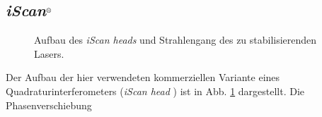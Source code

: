 \subsection{\textit{iScan}$^\text{\textregistered}$}\label{subsec:iScan}
\begin{figure}[h]
 	\centering
	\caption[\textit{iScan head} - Aufbau]{Aufbau
	des \textit{iScan heads} und Strahlengang des zu
	stabilisierenden Lasers.}\label{fig:iscan_aufbau}
\end{figure}
Der Aufbau der hier verwendeten kommerziellen Variante eines
Quadraturinterferometers (\textit{iScan head} \cite{iscan_hardware_guide}) ist
in Abb.
\ref{fig:iscan_aufbau} dargestellt. Die Phasenverschiebung
